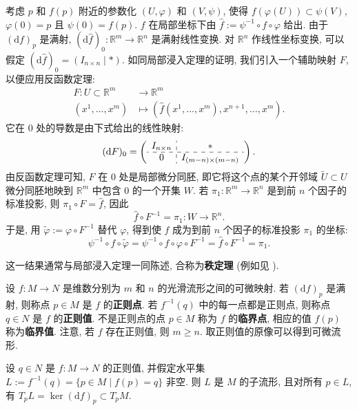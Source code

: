 \begin{RiemannProof}
考虑 $p$ 和 $f(p)$ 附近的参数化 $(U,\varphi)$ 和 $(V,\psi)$, 使得 $f(\varphi(U))\subset\psi(V)$, $\varphi(0)=p$ 且 $\psi(0)=f(p)$. $f$ 在局部坐标下由 $\widehat f:=\psi^{-1}\circ f\circ\varphi$ 给出. 由于 $(\mathrm{d}f)_p$ 是满射, $(\mathrm{d}\widehat f)_0:\mathbb{R}^m\to\mathbb{R}^n$ 是满射线性变换. 对 $\mathbb{R}^n$ 作线性坐标变换, 可以假定 $(\mathrm{d}\widehat f)_0=(I_{n\times n}\mid *)$. 如同局部浸入定理的证明, 我们引入一个辅助映射 $F$, 以便应用反函数定理:
\begin{align*}
  F:U\subset\mathbb{R}^m&\to\mathbb{R}^m\\
  (x^1,\ldots,x^m)&\mapsto(\widehat f(x^1,\ldots,x^m),x^{n+1},\ldots,x^m).
\end{align*}
它在 $0$ 处的导数是由下式给出的线性映射:
\[
  (\mathrm{d}F)_0=\left(\begin{array}{c:c}
  I_{n\times n}&*\\ \hdashline
  0&I_{(m-n)\times(m-n)}
  \end{array}\right).
\]
由反函数定理可知, $F$ 在 $0$ 处是局部微分同胚, 即它将这个点的某个开邻域 $\widetilde U\subset U$ 微分同胚地映到 $\mathbb{R}^m$ 中包含 $0$ 的一个开集 $W$. 若 $\pi_1:\mathbb{R}^m\to\mathbb{R}^n$ 是到前 $n$ 个因子的标准投影, 则 $\pi_1\circ F=\widehat f$, 因此
\[
  \widehat f\circ F^{-1}=\pi_1:W\to\mathbb{R}^n.
\]
于是, 用 $\widetilde\varphi:=\varphi\circ F^{-1}$ 替代 $\varphi$, 得到使 $f$ 成为到前 $n$ 个因子的标准投影 $\pi_1$ 的坐标:
\[
  \psi^{-1}\circ f\circ\widetilde\varphi
  =\psi^{-1}\circ f\circ\varphi\circ F^{-1}
  =\widehat f\circ F^{-1}=\pi_1.
\]
\end{RiemannProof}

\begin{RiemannRemark}\label{rem:rank-theorem}
这一结果通常与局部浸入定理一同陈述, 合称为\textbf{秩定理} (例如见 ).
\end{RiemannRemark}

设 $f:M\to N$ 是维数分别为 $m$ 和 $n$ 的光滑流形之间的可微映射. 若 $(\mathrm{d}f)_p$ 是满射, 则称点 $p\in M$ 是 $f$ 的\textbf{正则点}. 若 $f^{-1}(q)$ 中的每一点都是正则点, 则称点 $q\in N$ 是 $f$ 的\textbf{正则值}. 不是正则点的点 $p\in M$ 称为 $f$ 的\textbf{临界点}, 相应的值 $f(p)$ 称为\textbf{临界值}. 注意, 若 $f$ 存在正则值, 则 $m\geq n$. 取正则值的原像可以得到可微流形.

\begin{RiemannTheorem}\label{thm:submanifold-of-regular-level-set}
设 $q\in N$ 是 $f:M\to N$ 的正则值, 并假定水平集 $L:=f^{-1}(q)=\{p\in M\mid f(p)=q\}$ 非空. 则 $L$ 是 $M$ 的子流形, 且对所有 $p\in L$, 有 $T_pL=\ker(\mathrm{d}f)_p\subset T_pM$.
\end{RiemannTheorem}

